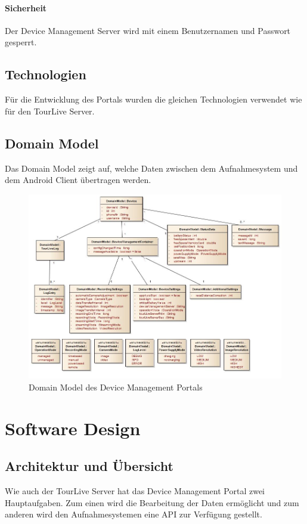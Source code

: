 \paragraph{Sicherheit}
Der Device Management Server wird mit einem Benutzernamen und Passwort gesperrt. 

\subsection{Technologien}
Für die Entwicklung des Portals wurden die gleichen Technologien verwendet wie für den TourLive Server. 

\subsection{Domain Model}
Das Domain Model zeigt auf, welche Daten zwischen dem Aufnahmesystem und dem Android Client übertragen werden.

\begin{figure}[H]
	\centering
	\includegraphics[width=120mm]{images/devmgmtsrv/domainmodel.jpg}
	\caption{Domain Model des Device Management Portals}
\end{figure}


\section{Software Design}
\subsection{Architektur und Übersicht}
Wie auch der TourLive Server hat das Device Management Portal zwei Hauptaufgaben. Zum einen wird die Bearbeitung der Daten ermöglicht und zum anderen wird den Aufnahmesystemen eine API zur Verfügung gestellt.


